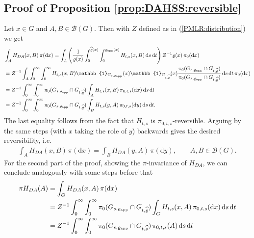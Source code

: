 \documentclass[sn-mathphys-num]{sn-jnl}%
\theoremstyle{thmstyleone}%
\theoremstyle{thmstyletwo}%
\theoremstyle{thmstylethree}%
\newcommand{\rhoapp}{\varrho_{{\rm app}}}
\begin{document}
\begin{appendices}
\subsection{Proof of Proposition \ref{prop:DAHSS:reversible}}\label{app:DAHSS:reversible}
Let $x\in G$ and $A,B\in\mathcal{B}(G)$. Then with $Z$ defined as in (\ref{PMLR:distribution}) we get 
\begin{align*}
	&\int_{A} H_{{DA}}(x,B)  \, \pi(\mathrm{d}x)
	= \int_{A} \left( \frac{1}{\varrho(x)} \int_{0}^{\widehat{\varrho}(x)} \int_{0}^{\rhoapp(x)} H_{t,s}(x, B)  \, \mathrm{d}s  \, \mathrm{d}t \right) Z^{-1} \varrho(x)  \, \pi_0(\mathrm{d}x) \\
	&= Z^{-1}  \int_{A} \int_{0}^{\infty} \int_{0}^{\infty} H_{t,s}(x, B) \mathbb{1}_{G_{s,\rhoapp}}(x) \mathbb{1}_{G_{t,\widehat{\varrho}}}(x) \frac{\pi_0(G_{s,\rhoapp} \cap  G_{t,\widehat{\varrho}})}{\pi_0(G_{s,\rhoapp} \cap G_{t,\widehat{\varrho}})}
	 \,\mathrm{d}s  \, \mathrm{d}t  \, \pi_0(\mathrm{d}x) \\
	&= Z^{-1}  \int_{0}^{\infty} \int_{0}^{\infty} \pi_0(G_{s,\rhoapp} \cap  G_{t,\widehat{\varrho}}) \int_{A} H_{t,s}(x, B)  \, \pi_{0,t,s} (\mathrm{d}x)  \, \mathrm{d}s  \, \mathrm{d}t  \\
	&= Z^{-1}  \int_{0}^{\infty} \int_{0}^{\infty} \pi_0(G_{s,\rhoapp} \cap  G_{t,\widehat{\varrho}}) \int_{B} H_{t,s}(y, A)  \,  \pi_{0,t,s} (\mathrm{d}y)  \, \mathrm{d}s  \, \mathrm{d}t.
\end{align*}
The last equality follows from the fact that $H_{t,s}$ is $\pi_{0,t,s}$-reversible. Arguing by the same steps (with $x$ taking the role of $y$) backwards gives the desired reversibility, i.e. 
 \begin{align*}
        \int_{A} H_{{DA}}(x,B)  \, \pi(\mathrm{d}x)=\int_{B} H_{{DA}}(y,A)  \, \pi(\mathrm{d}y), \qquad A,B\in\mathcal{B}(G).
    \end{align*}
For the second part of the proof, showing the $\pi$-invariance of $H_{{DA}}$, we can conclude analogously with some steps before that  
\begin{align*}
    \pi H_{DA}(A)&= \int_{G} H_{{DA}}(x,A) \, \pi(\mathrm{d}x) \\
                 &= Z^{-1}  \int_{0}^{\infty} \int_{0}^{\infty} \pi_0(G_{s,\rhoapp} \cap  G_{t,\widehat{\varrho}}) \int_{G} H_{t,s}(x, A)  \,  \pi_{0,t,s} (\mathrm{d}x)  \, \mathrm{d}s  \, \mathrm{d}t \\
                 &=  Z^{-1}  \int_{0}^{\infty} \int_{0}^{\infty} \pi_0(G_{s,\rhoapp} \cap  G_{t,\widehat{\varrho}}) \, \pi_{0,t,s} (A)  \, \mathrm{d}s  \, \mathrm{d}t \\

\end{align*}
\end{appendices}
\end{document}
